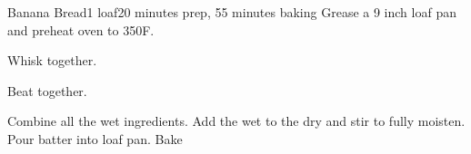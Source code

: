 \documentclass[../Cookbook.tex]{subfiles}
\begin{document}
\begin{recipe}{Banana Bread}{1 loaf}{20 minutes prep, 55 minutes baking}
	Grease a 9 inch loaf pan and preheat oven to 350\0F.

	Whisk together.

	Beat together.

	Combine all the wet ingredients.
	Add the wet to the dry and stir to fully moisten.
	Pour batter into loaf pan.
	Bake 
\end{recipe}
\end{document}
